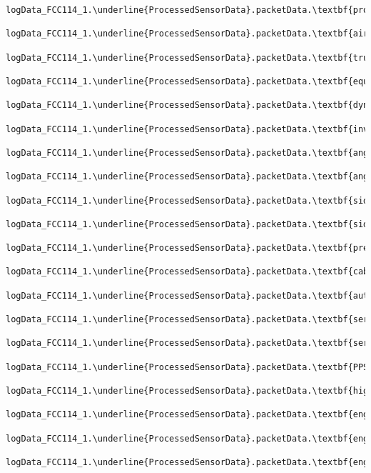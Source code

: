 \documentclass[10pt]{extarticle}
\begin{document}
\begin{Verbatim}[baselinestretch=.9,commandchars=\\\{\}]
logData_FCC114_1.\underline{ProcessedSensorData}.packetData.\textbf{propulsionBatteryRemaining}

logData_FCC114_1.\underline{ProcessedSensorData}.packetData.\textbf{airDataInterfaceHealth}

logData_FCC114_1.\underline{ProcessedSensorData}.packetData.\textbf{trueAirspeed}

logData_FCC114_1.\underline{ProcessedSensorData}.packetData.\textbf{equivalentAirspeed}

logData_FCC114_1.\underline{ProcessedSensorData}.packetData.\textbf{dynamicPressure}

logData_FCC114_1.\underline{ProcessedSensorData}.packetData.\textbf{inverseDynamicPressure}

logData_FCC114_1.\underline{ProcessedSensorData}.packetData.\textbf{angleOfAttackValid}

logData_FCC114_1.\underline{ProcessedSensorData}.packetData.\textbf{angleOfAttack}

logData_FCC114_1.\underline{ProcessedSensorData}.packetData.\textbf{sideSlipValid}

logData_FCC114_1.\underline{ProcessedSensorData}.packetData.\textbf{sideSlip}

logData_FCC114_1.\underline{ProcessedSensorData}.packetData.\textbf{pressureAltitude}

logData_FCC114_1.\underline{ProcessedSensorData}.packetData.\textbf{cableT}ension

logData_FCC114_1.\underline{ProcessedSensorData}.packetData.\textbf{autopilotVoltage}

logData_FCC114_1.\underline{ProcessedSensorData}.packetData.\textbf{servoVoltage1}

logData_FCC114_1.\underline{ProcessedSensorData}.packetData.\textbf{servoVoltage2}

logData_FCC114_1.\underline{ProcessedSensorData}.packetData.\textbf{PPS_Pulse}

logData_FCC114_1.\underline{ProcessedSensorData}.packetData.\textbf{highRangeAccelerometer}

logData_FCC114_1.\underline{ProcessedSensorData}.packetData.\textbf{engineVoltage}

logData_FCC114_1.\underline{ProcessedSensorData}.packetData.\textbf{engineCurrent}

logData_FCC114_1.\underline{ProcessedSensorData}.packetData.\textbf{engineConsumption}


\end{Verbatim}
\end{document}
